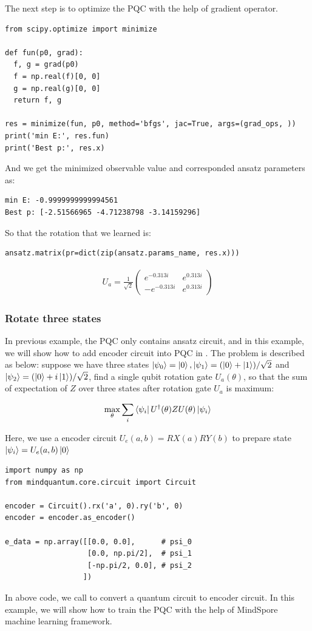 The next step is to optimize the PQC with the help of gradient operator.
\begin{lstlisting}
from scipy.optimize import minimize

def fun(p0, grad):
  f, g = grad(p0)
  f = np.real(f)[0, 0]
  g = np.real(g)[0, 0]
  return f, g

res = minimize(fun, p0, method='bfgs', jac=True, args=(grad_ops, ))
print('min E:', res.fun)
print('Best p:', res.x)
\end{lstlisting}
And we get the minimized observable value and corresponded ansatz parameters as:
\begin{lstlisting}
min E: -0.9999999999994561
Best p: [-2.51566965 -4.71238798 -3.14159296]
\end{lstlisting}
So that the rotation that we learned is:
\begin{lstlisting}
ansatz.matrix(pr=dict(zip(ansatz.params_name, res.x)))
\end{lstlisting}
\begin{align*}
  U_a=\frac{1}{\sqrt{2}}\begin{pmatrix}
                          e^{-0.313i}  & e^{0.313i} \\
                          -e^{-0.313i} & e^{0.313i}
                        \end{pmatrix}
\end{align*}

\subsubsection{Rotate three states}
In previous example, the PQC only contains ansatz circuit, and in this example, we will show how to add encoder circuit into PQC in \MindQuantum. The problem is described as below: suppose we have three states $\ket{\psi_0}=\ket{0},\ket{\psi_1}=(\ket{0}+\ket{1})/\sqrt{2}$ and $\ket{\psi_2}=(\ket{0}+i\ket{1})/\sqrt{2}$, find a single qubit rotation gate $U_a(\theta)$, so that the sum of expectation of $Z$ over three states after rotation gate $U_a$ is maximum:

\begin{equation}
  \max_{\theta}\sum_i{\bra{\psi_i}U^\dagger(\theta)ZU(\theta)\ket{\psi_i}}
\end{equation}

Here, we use a encoder circuit $U_e(a, b) = RX(a)RY(b)$ to prepare state $\ket{\psi_i}=U_e(a, b)\ket{0}$
\begin{lstlisting}
import numpy as np
from mindquantum.core.circuit import Circuit

encoder = Circuit().rx('a', 0).ry('b', 0)
encoder = encoder.as_encoder()

e_data = np.array([[0.0, 0.0],      # psi_0
                   [0.0, np.pi/2],  # psi_1
                   [-np.pi/2, 0.0], # psi_2
                  ])
\end{lstlisting}
In above code, we call \asencoder to convert a quantum circuit to encoder circuit. In this example, we will show how to train the PQC with the help of MindSpore machine learning framework.

